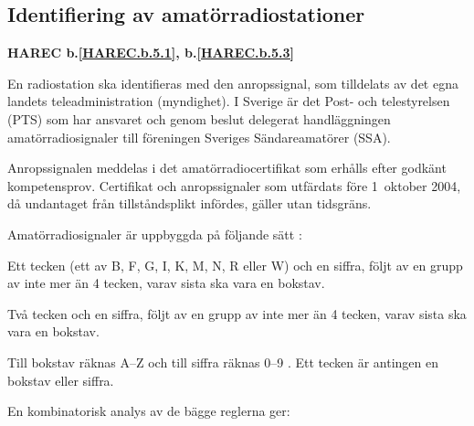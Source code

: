 \subsection{Identifiering av amatörradiostationer}
\textbf{
HAREC b.\ref{HAREC.b.5.1}\label{myHAREC.b.5.1},
 b.\ref{HAREC.b.5.3}\label{myHAREC.b.5.3}
}

En radiostation ska identifieras med den anropssignal, som tilldelats av det egna landets teleadministration (myndighet).
I Sverige är det Post- och telestyrelsen (PTS) som har ansvaret och genom
beslut delegerat handläggningen amatörradiosignaler till föreningen Sveriges Sändareamatörer (SSA).

Anropssignalen meddelas i det amatörradiocertifikat som erhålls efter godkänt kompetensprov.
Certifikat och anropssignaler som utfärdats före 1~oktober 2004, då undantaget från tillståndsplikt infördes, gäller utan tidsgräns.



Amatörradiosignaler är uppbyggda på följande sätt \cite[§19.68, §19.69]{ITU-RR}:

Ett tecken (ett av B, F, G, I, K, M, N, R eller W) och en siffra, följt av en
grupp av inte mer än 4 tecken, varav sista ska vara en bokstav.

Två tecken och en siffra, följt av en grupp av inte mer än 4 tecken, varav
sista ska vara en bokstav.

Till bokstav räknas A--Z och till siffra räknas 0--9 \cite[§19.45]{ITU-RR}.
Ett tecken är antingen en bokstav eller siffra.

En kombinatorisk analys av de bägge reglerna ger:


